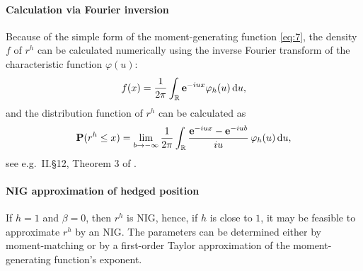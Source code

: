 \paragraph*{Calculation via Fourier inversion}
\label{sec:calc-via-four}

Because of the simple form of the moment-generating function
\eqref{eq:7}, the density $f$ of $r^h$ can be calculated numerically
using the inverse Fourier transform of the characteristic function
$\varphi(u) $:
\begin{equation*}
  f(x) = \frac{1}{2\pi} \int_{\mathbb{R}} {\bf e}^{-i u x} \varphi_h(u)\, {\rm d} u, 
\end{equation*}
and the distribution function of $r^h$ can be calculated as
\begin{equation*}
  {\bf P}(r^h\leq x) = \lim_{b\rightarrow-\infty} \frac{1}{2\pi} \int_{\mathbb{R}}
  \frac{{\bf e}^{-i u x} - {\bf e}^{-i u b}}{i u}\, \varphi_h(u)\, {\rm d} u,
\end{equation*}
see e.g.\ II.\S 12, Theorem 3 of \citep{Shiryaev1996}.


\paragraph*{NIG approximation of hedged position}
\label{sec:nig-appr-hedg}

If $h=1$ and $\beta=0$, then $r^h$ is NIG, hence, if $h$ is close to
$1$, it may be feasible to approximate $r^h$ by an NIG. The parameters
can be determined either by moment-matching or by a first-order Taylor
approximation of the moment-generating function's exponent.



